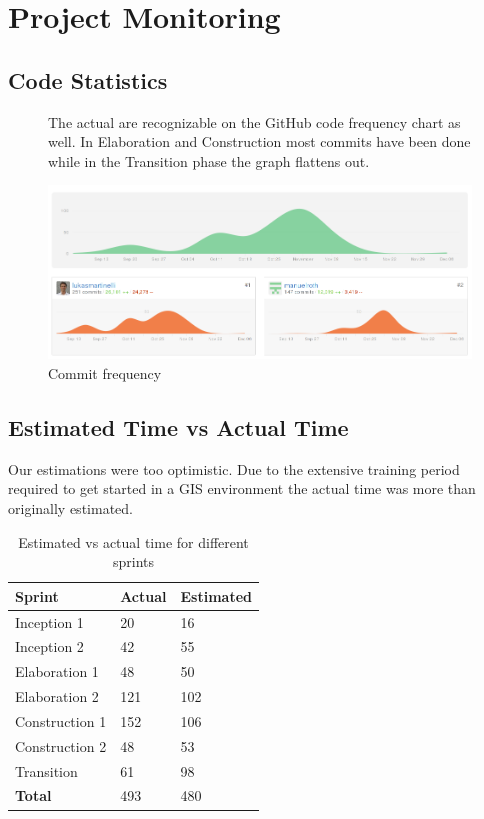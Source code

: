 \chapter{Project Monitoring}\label{project monitoring}

\section{Code Statistics}

\begin{figure}[H]

The actual  are recognizable on the GitHub code frequency chart as well. In Elaboration and Construction most commits have been done while in the Transition phase the graph flattens out.

  \centering
  \includegraphics[width=1\textwidth]{images/github_commits.png}
  \caption{Commit frequency}
\end{figure}

\section{Estimated Time vs Actual Time}

Our estimations were too optimistic. Due to the extensive
training period required to get started in a GIS environment
the actual time was more than originally estimated.


\begin{table}[H]
\centering
    \begin{tabular}{lll}
    \textbf{Sprint}        & \textbf{Actual} & \textbf{Estimated} \\
     \hline
    Inception 1    & 20     & 16        \\
    Inception 2    & 42     & 55        \\
    Elaboration 1  & 48     & 50        \\
    Elaboration 2  & 121    & 102       \\
    Construction 1 & 152    & 106         \\
    Construction 2 & 48     & 53        \\
    Transition     & 61 & 98        \\
    \hline
    \textbf{Total}          & 493 & 480 \\
    \end{tabular}
    \caption{Estimated vs actual time for different sprints}
\end{table}

